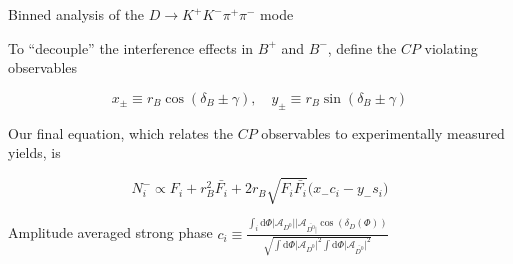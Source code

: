 \documentclass{beamer}
\begin{document}
\begin{frame}{Binned analysis of the $D\to K^+K^-\pi^+\pi^-$ mode}
  \begin{center}
    \Large To ``decouple'' the interference effects in $B^+$ and $B^-$, define the $C\!P$ violating observables
  \end{center}
  \vspace{-0.1cm}
  \begin{equation*}
    x_\pm\equiv r_B\cos(\delta_B\pm\gamma), \quad y_\pm\equiv r_B\sin(\delta_B\pm\gamma)
  \end{equation*}
  \begin{center}
    \Large Our final equation, which relates the $C\!P$ observables to experimentally measured yields, is
  \end{center}
  \begin{equation*}
    N_i^-\propto F_i + r_B^2\bar{F_i} + 2r_B\sqrt{F_i\bar{F_i}}\big(x_-c_i - y_-s_i\big)
  \end{equation*}
  \vspace{-0.7cm}
  \begin{center}
    \begin{minipage}{6cm}
      \begin{block}{\centering Amplitude averaged strong phase}
        \centering
        $c_i\equiv\frac{\int_i\mathrm{d}\Phi\lvert\mathcal{A}_{D^0}\lvert\lvert\mathcal{A}_{\bar{D^0}\lvert}\cos(\delta_D(\Phi))}{\sqrt{\int\mathrm{d}\Phi\lvert\mathcal{A}_{D^0}\lvert^2\int\mathrm{d}\Phi\lvert\mathcal{A}_{\bar{D^0}}\lvert^2}}$
      \end{block}
    \end{minipage}
  \end{center}
\end{frame}
\end{document}
